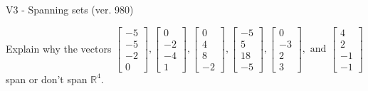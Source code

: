 \begin{exercise}
  \begin{exerciseTitle}V3 - Spanning sets (ver. 980)\end{exerciseTitle}
  \begin{exerciseStatement}
    Explain why the vectors \(\left[\begin{array}{r}
-5 \\
-5 \\
-2 \\
0
\end{array}\right] , \left[\begin{array}{r}
0 \\
-2 \\
-4 \\
1
\end{array}\right] , \left[\begin{array}{r}
0 \\
4 \\
8 \\
-2
\end{array}\right] , \left[\begin{array}{r}
-5 \\
5 \\
18 \\
-5
\end{array}\right] , \left[\begin{array}{r}
0 \\
-3 \\
2 \\
3
\end{array}\right] , \text{ and } \left[\begin{array}{r}
4 \\
2 \\
-1 \\
-1
\end{array}\right]\) span or don't span \(\mathbb{R}^4\). 
	



\end{exerciseStatement}
\end{exercise}
